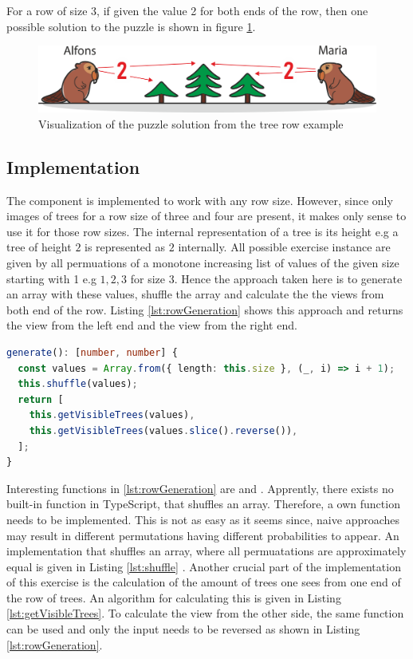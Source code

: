 \begin{example}
    For a row of size 3, if given the value 2 for both ends of the row, then one possible solution to the puzzle is shown in figure \ref{fig:tree_row_example}.
\end{example}

\begin{figure} 
    \centering
    \includegraphics[width=0.8 \columnwidth]{figures/tree_row_example.png}
    \caption{Visualization of the puzzle solution from the tree row example} 
    \label{fig:tree_row_example} 
\end{figure}

\subsection{Implementation}

The  component is implemented to work with any row size. However, since only images of trees for a row size of three and four are present, it makes only sense to use it for those row sizes.
The internal representation of a tree is its height e.g a tree of height $2$ is represented as $2$ internally.
All possible exercise instance are given by all permuations of a monotone increasing list of values of the given size starting with 1 e.g $1,2,3$ for size 3. Hence the approach taken here is to generate an array with these values, shuffle the array and calculate the the views from both end of the row. Listing \ref{lst:rowGeneration} shows this approach and returns the view from the left end and the view from the right end.

\begin{lstlisting}[language=TypeScript,caption={Algorithm to generate a row of trees exercise instance of \code{this.size}},label={lst:rowGeneration}]
generate(): [number, number] {
  const values = Array.from({ length: this.size }, (_, i) => i + 1);
  this.shuffle(values);
  return [
    this.getVisibleTrees(values),
    this.getVisibleTrees(values.slice().reverse()),
  ];
}
\end{lstlisting}

Interesting functions in \ref{lst:rowGeneration} are  and . Apprently, there exists no built-in function in TypeScript, that shuffles an array. Therefore, a own function needs to be implemented. This is not as easy as it seems since, naive approaches may result in different permutations having different probabilities to appear. An implementation that shuffles an array, where all permuatations are approximately equal is given in Listing \ref{lst:shuffle} \cite{JavaScriptShuffle}.
Another crucial part of the implementation of this exercise is the calculation of the amount of trees one sees from one end of the row of trees. An algorithm for calculating this is given in Listing \ref{lst:getVisibleTrees}. To calculate the view from the other side, the same function can be used and only the input needs to be reversed as shown in Listing \ref{lst:rowGeneration}.

